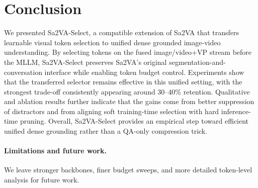 \section{Conclusion}
\label{sec:conclusion}

We presented Sa2VA-Select, a compatible extension of Sa2VA that transfers learnable visual token selection to unified dense grounded image-video understanding.
By selecting tokens on the fused image/video+VP stream before the MLLM, Sa2VA-Select preserves Sa2VA's original segmentation-and-conversation interface while enabling token budget control.
Experiments show that the transferred selector remains effective in this unified setting, with the strongest trade-off consistently appearing around 30--40\% retention.
Qualitative and ablation results further indicate that the gains come from better suppression of distractors and from aligning soft training-time selection with hard inference-time pruning.
Overall, Sa2VA-Select provides an empirical step toward efficient unified dense grounding rather than a QA-only compression trick.

\paragraph{Limitations and future work.}
We leave stronger backbones, finer budget sweeps, and more detailed token-level analysis for future work.
